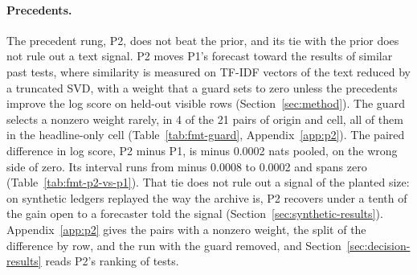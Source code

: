 \paragraph{Precedents.}
The precedent rung, P2, does not beat the prior, and its tie with the prior does not rule out a text signal. P2 moves P1's forecast toward the results of similar past tests, where similarity is measured on TF-IDF vectors of the text reduced by a truncated SVD, with a weight that a guard sets to zero unless the precedents improve the log score on held-out visible rows (Section~\ref{sec:method}). The guard selects a nonzero weight rarely, in 4 of the 21 pairs of origin and cell, all of them in the headline-only cell (Table~\ref{tab:fmt-guard}, Appendix~\ref{app:p2}). The paired difference in log score, P2 minus P1, is minus 0.0002 nats pooled, on the wrong side of zero. Its interval runs from minus 0.0008 to 0.0002 and spans zero (Table~\ref{tab:fmt-p2-vs-p1}). That tie does not rule out a signal of the planted size: on synthetic ledgers replayed the way the archive is, P2 recovers under a tenth of the gain open to a forecaster told the signal (Section~\ref{sec:synthetic-results}). Appendix~\ref{app:p2} gives the pairs with a nonzero weight, the split of the difference by row, and the run with the guard removed, and Section~\ref{sec:decision-results} reads P2's ranking of tests.

